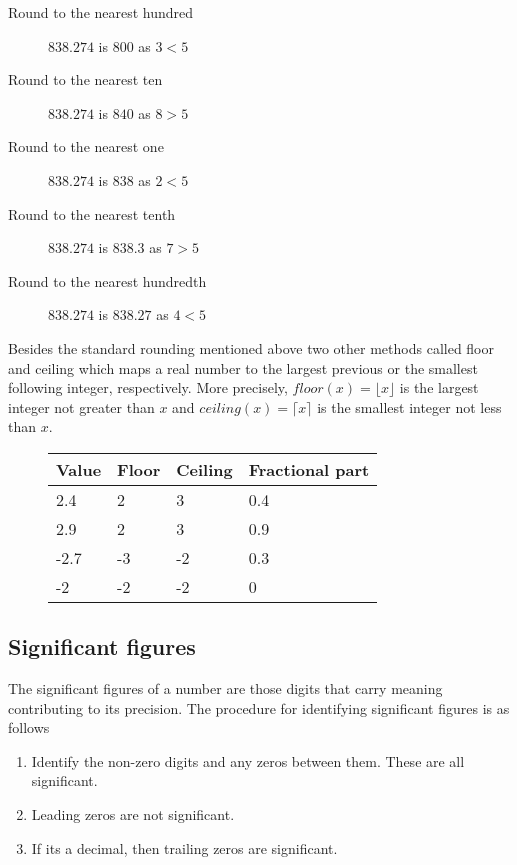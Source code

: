 \begin{description}
\item [Round to the nearest hundred] $838.274$ is $800$ as $3 < 5$
\item [Round to the nearest ten] $838.274$ is $840$ as $8 > 5$
\item [Round to the nearest one] $838.274$ is $838$ as $2 < 5$
\item [Round to the nearest tenth] $838.274$ is $838.3$ as $7 > 5$
\item [Round to the nearest hundredth] $838.274$ is $838.27$ as $4 < 5$
\end{description}

Besides the standard rounding mentioned above two other methods called floor and ceiling which maps a real number to the largest previous or the smallest following integer, respectively. More precisely, $floor(x) = \lfloor x \rfloor$ is the largest integer not greater than $x$ and $ceiling(x) =  \lceil x \rceil$ is the smallest integer not less than $x$.
\begin{figure}[H]
\centering
\begin{tabular}{|l|l|l|l|}
\hline
\textbf{Value}  & \textbf{Floor} & \textbf{Ceiling} & \textbf{Fractional part} \\ \hline
2.4	            & 2	            & 3	              & 0.4                      \\ \hline
2.9	            & 2	            & 3	              & 0.9                      \\ \hline
-2.7	            & -3	            & -2	              & 0.3                      \\ \hline
-2	            & -2	            & -2	              & 0                        \\ \hline
\end{tabular}
\end{figure}

\subsection{Significant figures}
The significant figures of a number are those digits that carry meaning contributing to its precision. The procedure for identifying significant figures is as follows
\begin{enumerate}
\item Identify the non-zero digits and any zeros between them. These are all significant.
\item Leading zeros are not significant.
\item If its a decimal, then trailing zeros are significant.
\end{enumerate}

